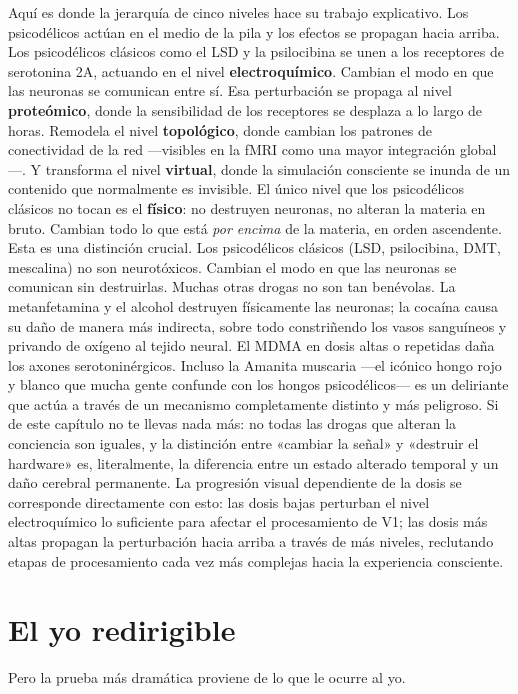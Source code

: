 \documentclass[11pt, twoside, openright]{book}
\begin{document}
Aquí es donde la jerarquía de cinco niveles hace su trabajo explicativo. Los psicodélicos actúan en el medio de la pila y los efectos se propagan hacia arriba. Los psicodélicos clásicos como el LSD y la psilocibina se unen a los receptores de serotonina 2A, actuando en el nivel \textbf{electroquímico}. Cambian el modo en que las neuronas se comunican entre sí. Esa perturbación se propaga al nivel \textbf{proteómico}, donde la sensibilidad de los receptores se desplaza a lo largo de horas. Remodela el nivel \textbf{topológico}, donde cambian los patrones de conectividad de la red ---visibles en la fMRI como una mayor integración global---. Y transforma el nivel \textbf{virtual}, donde la simulación consciente se inunda de un contenido que normalmente es invisible. El único nivel que los psicodélicos clásicos no tocan es el \textbf{físico}: no destruyen neuronas, no alteran la materia en bruto. Cambian todo lo que está \textit{por encima} de la materia, en orden ascendente. Esta es una distinción crucial. Los psicodélicos clásicos (LSD, psilocibina, DMT, mescalina) no son neurotóxicos. Cambian el modo en que las neuronas se comunican sin destruirlas. Muchas otras drogas no son tan benévolas. La metanfetamina y el alcohol destruyen físicamente las neuronas; la cocaína causa su daño de manera más indirecta, sobre todo constriñendo los vasos sanguíneos y privando de oxígeno al tejido neural. El MDMA en dosis altas o repetidas daña los axones serotoninérgicos. Incluso la Amanita muscaria ---el icónico hongo rojo y blanco que mucha gente confunde con los hongos psicodélicos--- es un deliriante que actúa a través de un mecanismo completamente distinto y más peligroso. Si de este capítulo no te llevas nada más: no todas las drogas que alteran la conciencia son iguales, y la distinción entre «cambiar la señal» y «destruir el hardware» es, literalmente, la diferencia entre un estado alterado temporal y un daño cerebral permanente. La progresión visual dependiente de la dosis se corresponde directamente con esto: las dosis bajas perturban el nivel electroquímico lo suficiente para afectar el procesamiento de V1; las dosis más altas propagan la perturbación hacia arriba a través de más niveles, reclutando etapas de procesamiento cada vez más complejas hacia la experiencia consciente.

\section*{El yo redirigible}

Pero la prueba más dramática proviene de lo que le ocurre al yo.
\end{document}
